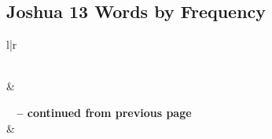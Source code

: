 

\subsection{Joshua 13 Words by Frequency}


\normalsize
 
\begin{center}
\begin{longtable}{l|r}
\caption[Joshua 13 Words by Frequency]{Joshua 13 Words by Frequency}\label{table:WordsbyFrequency for Joshua 13} \\
\hline {} &  \\ \hline 
\endfirsthead
 
{{\bfseries \tablename\ \thetable{} -- continued from previous page}} \\  
\hline {} &  \\ \hline 
\endhead
 

\end{longtable}
\end{center}
